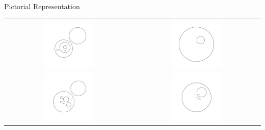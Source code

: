 \begin{frame}{Pictorial Representation}
\begin{tabular}{cc}
        \includegraphics[width=0.4\textwidth]{figures/graph_0011_1009.pdf}
     &  
        \includegraphics[width=0.4\textwidth]{figures/graph_0017_1009.pdf}
     \\
        \includegraphics[width=0.4\textwidth]{figures/graph_0022_1009.pdf}
     &  
        \includegraphics[width=0.4\textwidth]{figures/graph_0026_1009.pdf}
\end{tabular}
\end{frame}

